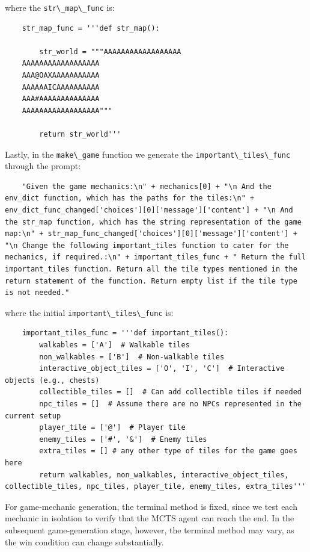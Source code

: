 \documentclass{article} %
\begin{document}
where the \lstinline|str\_map\_func| is:

\begin{lstlisting}
    str_map_func = '''def str_map():

        str_world = """AAAAAAAAAAAAAAAAAA
    AAAAAAAAAAAAAAAAAA
    AAA@OAXAAAAAAAAAAA
    AAAAAAICAAAAAAAAAA
    AAA#AAAAAAAAAAAAAA
    AAAAAAAAAAAAAAAAAA"""
    
        return str_world'''
\end{lstlisting}

Lastly, in the \lstinline|make\_game| function we generate the \lstinline|important\_tiles\_func| through the prompt:

\begin{lstlisting}
    "Given the game mechanics:\n" + mechanics[0] + "\n And the env_dict function, which has the paths for the tiles:\n" + env_dict_func_changed['choices'][0]['message']['content'] + "\n And the str_map function, which has the string representation of the game map:\n" + str_map_func_changed['choices'][0]['message']['content'] + "\n Change the following important_tiles function to cater for the mechanics, if required.:\n" + important_tiles_func + " Return the full important_tiles function. Return all the tile types mentioned in the return statement of the function. Return empty list if the tile type is not needed."
\end{lstlisting}

where the initial \lstinline|important\_tiles\_func| is:

\begin{lstlisting}
    important_tiles_func = '''def important_tiles():
        walkables = ['A']  # Walkable tiles
        non_walkables = ['B']  # Non-walkable tiles
        interactive_object_tiles = ['O', 'I', 'C']  # Interactive objects (e.g., chests)
        collectible_tiles = []  # Can add collectible tiles if needed
        npc_tiles = []  # Assume there are no NPCs represented in the current setup
        player_tile = ['@']  # Player tile
        enemy_tiles = ['#', '&']  # Enemy tiles
        extra_tiles = [] # any other type of tiles for the game goes here
        return walkables, non_walkables, interactive_object_tiles, collectible_tiles, npc_tiles, player_tile, enemy_tiles, extra_tiles'''

\end{lstlisting}

For game‑mechanic generation, the terminal method is fixed, since we test each mechanic in isolation to verify that the MCTS agent can reach the end. In the subsequent game‑generation stage, however, the terminal method may vary, as the win condition can change substantially.
\end{document}
